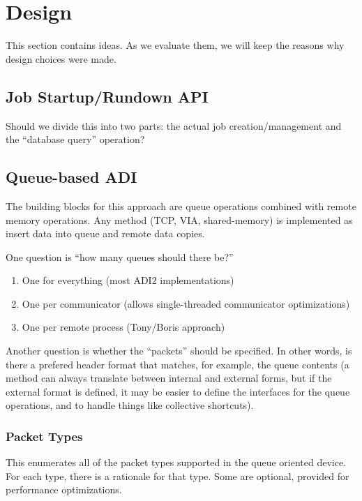 \documentclass{article}
\begin{document}
\section{Design}

This section contains ideas.  As we evaluate them, we will keep the reasons
why design choices were made.

\subsection{Job Startup/Rundown API}

Should we divide this into two parts: the actual job creation/management and
the ``database query'' operation?

\subsection{Queue-based ADI}
The building blocks for this approach are queue operations combined with
remote memory operations.  Any method (TCP, VIA, shared-memory) is implemented
as insert data into queue and remote data copies.

One question is ``how many queues should there be?''  

\begin{enumerate}
\item One for everything (most ADI2 implementations)
\item One per communicator (allows single-threaded communicator optimizations)
\item One per remote process (Tony/Boris approach)
\end{enumerate}

Another question is whether the ``packets'' should be specified.  In other
words, is there a prefered header format that matches, for example, the queue
contents (a method can always translate between internal and external forms,
but if the external format is defined, it may be easier to define the
interfaces for the queue operations, and to handle things like collective
shortcuts).

\subsubsection{Packet Types}
This enumerates all of the packet types supported in the queue oriented
device.  For each type, there is a rationale for that type.  Some are
optional, provided for performance optimizations.
\end{document}
